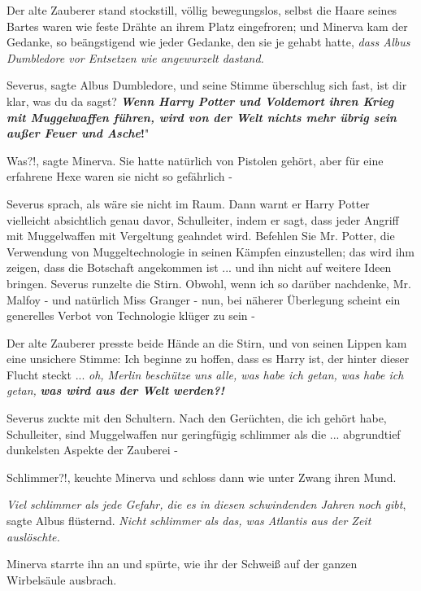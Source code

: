Der alte Zauberer stand stockstill, völlig bewegungslos, selbst die Haare seines
Bartes waren wie feste Drähte an ihrem Platz eingefroren; und Minerva kam der
Gedanke, so beängstigend wie jeder Gedanke, den sie je gehabt hatte, \emph{dass
Albus Dumbledore vor Entsetzen wie angewurzelt dastand.}

\glqq Severus\grqq{}, sagte Albus Dumbledore, und seine Stimme überschlug sich
fast, \glqq ist dir klar, was du da sagst? \textbf{\emph{Wenn Harry Potter und
Voldemort ihren Krieg mit Muggelwaffen führen, wird von der Welt nichts mehr
übrig sein außer Feuer und Asche}}\textbf{!}"

\glqq Was?!\grqq{}, sagte Minerva. Sie hatte natürlich von Pistolen gehört, aber
für eine erfahrene Hexe waren sie nicht so gefährlich -

Severus sprach, als wäre sie nicht im Raum. \glqq Dann warnt er Harry Potter
vielleicht absichtlich genau davor, Schulleiter, indem er sagt, dass jeder
Angriff mit Muggelwaffen mit Vergeltung geahndet wird. Befehlen Sie Mr. Potter,
die Verwendung von Muggeltechnologie in seinen Kämpfen einzustellen; das wird
ihm zeigen, dass die Botschaft angekommen ist ... und ihn nicht auf weitere
Ideen bringen.\grqq{} Severus runzelte die Stirn. \glqq Obwohl, wenn ich so
darüber nachdenke, Mr. Malfoy - und natürlich Miss Granger - nun, bei näherer
Überlegung scheint ein generelles Verbot von Technologie klüger zu sein -\grqq{}

Der alte Zauberer presste beide Hände an die Stirn, und von seinen Lippen kam
eine unsichere Stimme: \glqq Ich beginne zu hoffen, dass es Harry ist, der
hinter dieser Flucht steckt ... \emph{oh, Merlin beschütze uns alle, was habe
ich getan, was habe ich getan, }\textbf{\emph{was wird aus der Welt
werden?!}}\grqq{}

Severus zuckte mit den Schultern. \glqq Nach den Gerüchten, die ich gehört habe,
Schulleiter, sind Muggelwaffen nur geringfügig schlimmer als die ... abgrundtief
dunkelsten Aspekte der Zauberei -\grqq{}

\glqq Schlimmer?!\grqq{}, keuchte Minerva und schloss dann wie unter Zwang ihren
Mund.

\glqq \emph{Viel} \emph{schlimmer als jede Gefahr, die es in diesen schwindenden
Jahren noch gibt}\grqq{}, sagte Albus flüsternd. \glqq \emph{Nicht schlimmer als
das, was Atlantis aus der Zeit auslöschte.}\grqq{}

Minerva starrte ihn an und spürte, wie ihr der Schweiß auf der ganzen
Wirbelsäule ausbrach.


